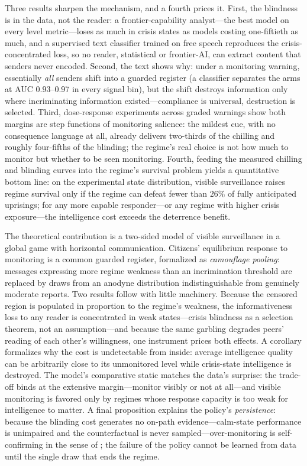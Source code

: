\documentclass[11pt]{article}
\theoremstyle{remark}
\begin{document}
Three results sharpen the mechanism, and a fourth prices it. First, the blindness is in the data, not the reader: a frontier-capability analyst---the best model on every level metric---loses as much in crisis states as models costing one-fiftieth as much, and a supervised text classifier trained on free speech reproduces the crisis-concentrated loss, so no reader, statistical or frontier-AI, can extract content that senders never encoded. Second, the text shows why: under a monitoring warning, essentially \emph{all} senders shift into a guarded register (a classifier separates the arms at AUC 0.93--0.97 in every signal bin), but the shift destroys information only where incriminating information existed---compliance is universal, destruction is selected. Third, dose-response experiments across graded warnings show both margins are step functions of monitoring salience: the mildest cue, with no consequence language at all, already delivers two-thirds of the chilling and roughly four-fifths of the blinding; the regime's real choice is not how much to monitor but whether to be seen monitoring. Fourth, feeding the measured chilling and blinding curves into the regime's survival problem yields a quantitative bottom line: on the experimental state distribution, visible surveillance raises regime survival only if the regime can defeat fewer than $26\%$ of fully anticipated uprisings; for any more capable responder---or any regime with higher crisis exposure---the intelligence cost exceeds the deterrence benefit.

The theoretical contribution is a two-sided model of visible surveillance in a global game with horizontal communication. Citizens' equilibrium response to monitoring is a common guarded register, formalized as \emph{camouflage pooling}: messages expressing more regime weakness than an incrimination threshold are replaced by draws from an anodyne distribution indistinguishable from genuinely moderate reports. Two results follow with little machinery. Because the censored region is populated in proportion to the regime's weakness, the informativeness loss to any reader is concentrated in weak states---crisis blindness as a selection theorem, not an assumption---and because the same garbling degrades peers' reading of each other's willingness, one instrument prices both effects. A corollary formalizes why the cost is undetectable from inside: average intelligence quality can be arbitrarily close to its unmonitored level while crisis-state intelligence is destroyed. The model's comparative static matches the data's surprise: the trade-off binds at the extensive margin---monitor visibly or not at all---and visible monitoring is favored only by regimes whose response capacity is too weak for intelligence to matter. A final proposition explains the policy's \emph{persistence}: because the blinding cost generates no on-path evidence---calm-state performance is unimpaired and the counterfactual is never sampled---over-monitoring is self-confirming in the sense of \citet{fudenberg1993}; the failure of the policy cannot be learned from data until the single draw that ends the regime.
\end{document}
